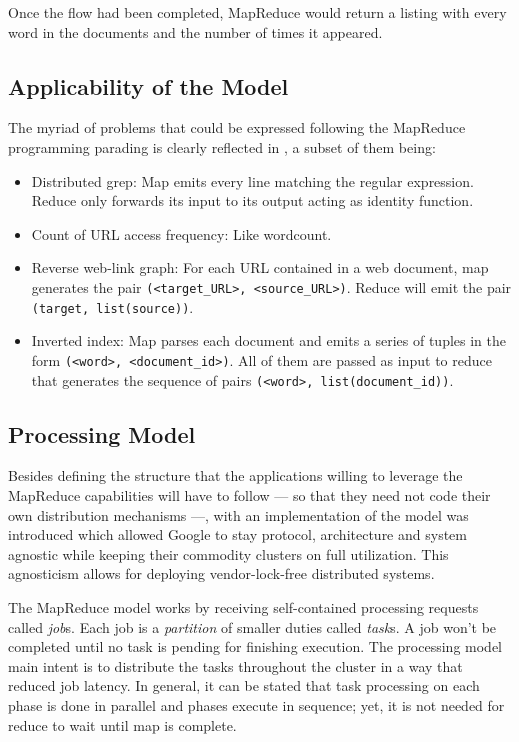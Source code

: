 Once the flow had been completed, MapReduce would return a listing with every word in the documents and the number of times it appeared.

\subsection{Applicability of the Model}\label{subsec:aplicabilidad}

\noindent The myriad of problems that could be expressed following the MapReduce programming parading is clearly reflected in \cite{googlemapreduce}, a subset of them being:

\begin{itemize}
 \item Distributed grep: Map emits every line matching the regular expression. Reduce only forwards its input to its output acting as identity function.
 \item Count of URL access frequency: Like wordcount.
 \item Reverse web-link graph: For each URL contained in a web document, map generates the pair \texttt{(<target_URL>, <source_URL>)}. Reduce will emit the pair \texttt{(target, list(source))}.
 \item Inverted index: Map parses each document and emits a series of tuples in the form \texttt{(<word>, <document_id>)}. All of them are passed as input to reduce that generates the sequence of pairs \texttt{(<word>, list(document_id))}.
\end{itemize}

\subsection{Processing Model}\label{subsec:processingmodel}

\noindent Besides defining the structure that the applications willing to leverage the MapReduce capabilities will have to follow --- so that they need not code their own distribution mechanisms ---, with \cite{googlemapreduce} an implementation of the model was introduced which allowed Google to stay protocol, architecture and system agnostic while keeping their commodity clusters on full utilization. This agnosticism allows for deploying vendor-lock-free distributed systems.

The MapReduce model works by receiving self-contained processing requests called \emph{job}s. Each job is a \emph{partition} of smaller duties called \emph{task}s. A job won't be completed until no task is pending for finishing execution. The processing model main intent is to distribute the tasks throughout the cluster in a way that reduced job latency. In general, it can be stated that task processing on each phase is done in parallel and phases execute in sequence; yet, it is not needed for reduce to wait until map is complete.

